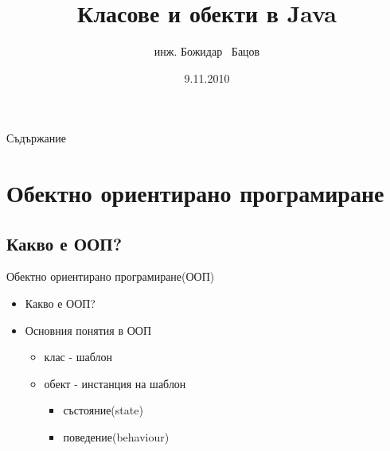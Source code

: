 \documentclass{beamer}
\title{Класове и обекти в Java}
\author{инж. Божидар ~Бацов}
\institute{Drow Ltd.}
\date{9.11.2010}
\begin{document}
\begin{frame}
  \titlepage
\end{frame}

\begin{frame}{Съдържание}
  \tableofcontents[pausesections]
\end{frame}

\section{Обектно ориентирано програмиране}

\subsection{Какво е ООП?}

\begin{frame}{Обектно ориентирано програмиране(ООП)}
  \transdissolve
  \begin{itemize}
  \item Какво е ООП?
  \item Основния понятия в ООП
    \begin{itemize}
      \item клас - шаблон
      \item обект - инстанция на шаблон
        \begin{itemize}
          \item състояние(state)
          \item поведение(behaviour)
        \end{itemize}
    \end{itemize}
  \end{itemize}
\end{frame}
\end{document}
